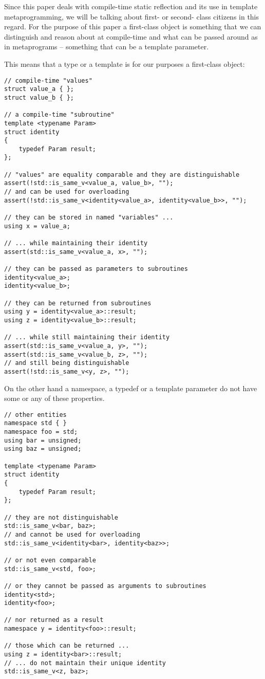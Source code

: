 Since this paper deals with compile-time static reflection and its use
in template metaprogramming, we will be talking about first- or second- class
citizens in this regard. 
For the purpose of this paper a first-class object is something that
we can distinguish and reason about at compile-time and what can be passed around
as  in metaprograms -- something that can be a template parameter.

This means that a type or a template is for our purposes a first-class object:

\begin{verbatim}
// compile-time "values"
struct value_a { };
struct value_b { };

// a compile-time "subroutine"
template <typename Param>
struct identity
{
	typedef Param result;
};

// "values" are equality comparable and they are distinguishable
assert(!std::is_same_v<value_a, value_b>, "");
// and can be used for overloading
assert(!std::is_same_v<identity<value_a>, identity<value_b>>, "");

// they can be stored in named "variables" ...
using x = value_a;

// ... while maintaining their identity
assert(std::is_same_v<value_a, x>, "");

// they can be passed as parameters to subroutines
identity<value_a>;
identity<value_b>;

// they can be returned from subroutines
using y = identity<value_a>::result;
using z = identity<value_b>::result;

// ... while still maintaining their identity
assert(std::is_same_v<value_a, y>, "");
assert(std::is_same_v<value_b, z>, "");
// and still being distinguishable
assert(!std::is_same_v<y, z>, "");
\end{verbatim}


On the other hand a namespace, a typedef or a template parameter do not have
some or any of these properties.

\begin{verbatim}
// other entities
namespace std { }
namespace foo = std;
using bar = unsigned;
using baz = unsigned;

template <typename Param>
struct identity
{
	typedef Param result;
};

// they are not distinguishable
std::is_same_v<bar, baz>;
// and cannot be used for overloading
std::is_same_v<identity<bar>, identity<baz>>;

// or not even comparable
std::is_same_v<std, foo>;

// or they cannot be passed as arguments to subroutines
identity<std>;
identity<foo>;

// nor returned as a result
namespace y = identity<foo>::result;

// those which can be returned ...
using z = identity<bar>::result;
// ... do not maintain their unique identity
std::is_same_v<z, baz>;
\end{verbatim}

